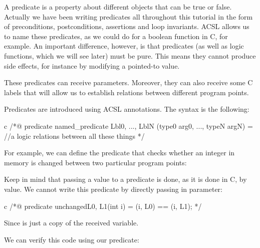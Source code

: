 A predicate is a property about different objects that can be true or
false. Actually we have been writing predicates all throughout this
tutorial in the form of preconditions, postconditions, assertions and loop invariants.
ACSL allows us to name these predicates, as we could do for a boolean
function in C, for example. An important difference, however, is that
predicates (as well as logic functions, which we will see later) must be pure.
This means they cannot produce side effects, for instance by modifying a pointed-to
value.

These predicates can receive parameters. Moreover, they can also
receive some C labels that will allow us to establish relations between
different program points.





Predicates are introduced using ACSL annotations. The syntax is the
following:



\begin{CodeBlock}{c}
/*@
  predicate named_predicate { Lbl0, ..., LblN }(type0 arg0, ..., typeN argN) =
    //a logic relations between all these things
*/
\end{CodeBlock}



For example, we can define the predicate that checks whether an integer
in memory is changed between two particular program points:






\begin{Warning}
  Keep in mind that passing a value to a predicate is done, as it is done in C,
  by value. We cannot write this predicate by directly passing  in
  parameter:

\begin{CodeBlock}{c}
/*@
  predicate unchanged{L0, L1}(int i) =
    \at(i, L0) == \at(i, L1);
 */
\end{CodeBlock}

  Since  is just a copy of the received variable.
\end{Warning}


We can verify this code using our predicate:






